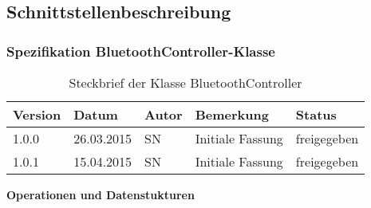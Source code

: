 \subsection{Schnittstellenbeschreibung}
\subsubsection{Spezifikation BluetoothController-Klasse}


\begin{table}[h!]
\begin{tabular}{|l|l|l|l|l|}
\hline 
Version & Datum & Autor & Bemerkung & Status \\ 
\hline 
1.0.0 & 26.03.2015 & SN & Initiale Fassung & freigegeben \\ 
\hline 
1.0.1 & 15.04.2015 & SN & Initiale Fassung & freigegeben \\ 
\hline 
\end{tabular} 
\caption{Steckbrief der Klasse BluetoothController}
\end{table}

\textbf{Operationen und Datenstukturen}
 
